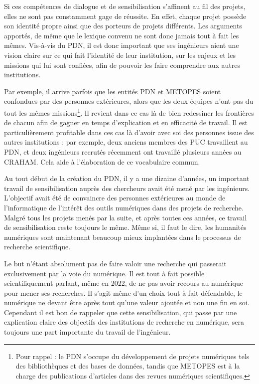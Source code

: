 \documentclass[a4paper,12pt,twoside]{book}
\begin{document}
     Si ces compétences de dialogue et de sensibilisation s'affinent au fil des projets, elles ne sont pas constamment gage de réussite. En effet, chaque projet possède son identité propre ainsi que des porteurs de projets différents. Les arguments apportés, de même que le lexique convenu ne sont donc jamais tout à fait les mêmes.
     Vis-à-vis du \acrshort{PDN}, il est donc important que ses ingénieurs aient une vision claire sur ce qui fait l'identité de leur institution, sur les enjeux et les missions qui lui sont confiées, afin de pouvoir les faire comprendre aux autres institutions.
     
     Par exemple, il arrive parfois que les entités \acrshort{PDN} et \acrshort{METOPES} soient confondues par des personnes extérieures, alors que les deux équipes n'ont pas du tout les mêmes missions\footnote{Pour rappel : le \acrshort{PDN} s'occupe du développement de projets numériques tels des bibliothèques et des bases de données, tandis que \acrshort{METOPES} est à la charge des publications d'articles dans des revues numériques scientifiques.}. Il revient dans ce cas là de bien redessiner les frontières de chacun afin de gagner en temps d'explication et en efficacité de travail. Il est particulièrement profitable dans ces cas là d'avoir avec soi des personnes issue des autres institutions : par exemple, deux anciens membres des \acrshort{PUC} travaillent au \acrshort{PDN}, et deux ingénieurs recrutés récemment ont travaillé plusieurs années au CRAHAM. Cela aide à l'élaboration de ce vocabulaire commun.
     
     
     Au tout début de la création du \acrshort{PDN}, il y a une dizaine d'années, un important travail de sensibilisation auprès des chercheurs avait été mené par les ingénieurs. L'objectif avait été de convaincre des personnes extérieures au monde de l'informatique de l'intérêt des outils numériques dans des projets de recherche. Malgré tous les projets menés par la suite, et après toutes ces années, ce travail de sensibilisation reste toujours le même. Même si, il faut le dire, les humanités numériques sont maintenant beaucoup mieux implantées dans le processus de recherche scientifique.
     
     Le but n'étant absolument pas de faire valoir une recherche qui passerait exclusivement par la voie du numérique. Il est tout à fait possible scientifiquement parlant, même en 2022, de ne pas avoir recours au numérique pour mener ses recherches. Il s'agit même d'un choix tout à fait défendable, le numérique ne devant être après tout qu'une valeur ajoutée et non une fin en soi. Cependant il est bon de rappeler que cette sensibilisation, qui passe par une explication claire des objectifs des institutions de recherche en numérique, sera toujours une part importante du travail de l'ingénieur.
     
\end{document}
